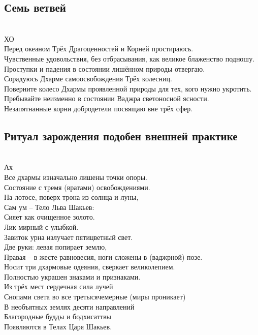 \subsection{Семь ветвей}
\\

ХО\\
Перед океаном Трёх Драгоценностей и Корней простираюсь.\\
Чувственные удовольствия, без отбрасывания, как великое блаженство подношу.\\
Проступки и падения в состоянии лишённом природы отвергаю.\\
Сорадуюсь Дхарме самоосвобождения Трёх колесниц.\\
Поверните колесо Дхармы проявленной природы для тех, кого нужно укротить.\\
Пребывайте неизменно в состоянии Ваджра светоносной ясности.\\
Незапятнанные корни добродетели посвящаю вне трёх сфер.

\subsection*{Ритуал зарождения подобен внешней практике}
\\
Ах\\
Все дхармы изначально лишены точки опоры.\\
Состояние с тремя (вратами) освобождениями.\\
На лотосе, поверх трона из солнца и луны,\\
Сам ум – Тело Льва Шакьев:\\
Сияет как очищенное золото.\\
Лик мирный с улыбкой.\\
Завиток урна излучает пятицветный свет.\\
Две руки: левая попирает землю,\\
Правая – в жесте равновесия, ноги сложены в (ваджрной) позе.\\
Носит три дхармовые одеяния, сверкает великолепием.\\
Полностью украшен знаками и признаками.\\
Из трёх мест сердечная сила лучей \\
Снопами света во все третысячемерные (миры проникает)\\
В необъятных землях десяти направлений\\
Благородные будды и бодхисаттвы\\
Появляются в Телах Царя Шакьев.\\
\\

